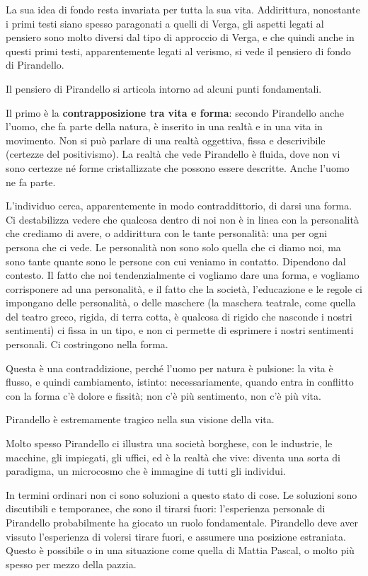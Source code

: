 La sua idea di fondo resta invariata per tutta la sua vita. Addirittura, nonostante i primi testi siano spesso paragonati a quelli di Verga, gli aspetti legati al pensiero sono molto diversi dal tipo di approccio di Verga, e che quindi anche in questi primi testi, apparentemente legati al verismo, si vede il pensiero di fondo di Pirandello.

Il pensiero di Pirandello si articola intorno ad alcuni punti fondamentali.

Il primo è la \textbf{contrapposizione tra vita e forma}: secondo Pirandello anche l'uomo, che fa parte della natura, è inserito in una realtà e in una vita in movimento. Non si può parlare di una realtà oggettiva, fissa e descrivibile (certezze del positivismo). La realtà che vede Pirandello è fluida, dove non vi sono certezze né forme cristallizzate che possono essere descritte. Anche l'uomo ne fa parte.

L'individuo cerca, apparentemente in modo contraddittorio, di darsi una forma. Ci destabilizza vedere che qualcosa dentro di noi non è in linea con la personalità che crediamo di avere, o addirittura con le tante personalità: una per ogni persona che ci vede.
Le personalità non sono solo quella che ci diamo noi, ma sono tante quante sono le persone con cui veniamo in contatto. Dipendono dal contesto.
Il fatto che noi tendenzialmente ci vogliamo dare una forma, e vogliamo corrisponere ad una personalità, e il fatto che la società, l'educazione e le regole ci impongano delle personalità, o delle maschere (la maschera teatrale, come quella del teatro greco, rigida, di terra cotta, è qualcosa di rigido che nasconde i nostri sentimenti) ci fissa in un tipo, e non ci permette di esprimere i nostri sentimenti personali. Ci costringono nella forma.

Questa è una contraddizione, perché l'uomo per natura è pulsione: la vita è flusso, e quindi cambiamento, istinto: necessariamente, quando entra in conflitto con la forma c'è dolore e fissità; non c'è più sentimento, non c'è più vita.

Pirandello è estremamente tragico nella sua visione della vita.

Molto spesso Pirandello ci illustra una società borghese, con le industrie, le macchine, gli impiegati, gli uffici, ed è la realtà che vive: diventa una sorta di paradigma, un microcosmo che è immagine di tutti gli individui.

In termini ordinari non ci sono soluzioni a questo stato di cose. Le soluzioni sono discutibili e temporanee, che sono il tirarsi fuori: l'esperienza personale di Pirandello probabilmente ha giocato un ruolo fondamentale.
Pirandello deve aver vissuto l'esperienza di volersi tirare fuori, e assumere una posizione estraniata.
Questo è possibile o in una situazione come quella di Mattia Pascal, o molto più spesso per mezzo della pazzia.

